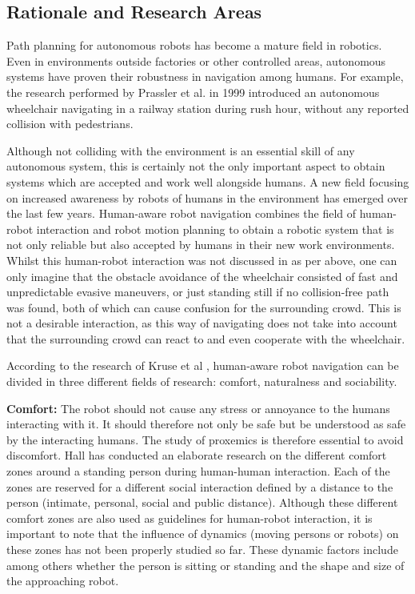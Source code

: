 \subsection{Rationale and Research Areas} \label{sec:HARNrev}
Path planning for autonomous robots has become a mature field in robotics. Even in environments outside factories or other controlled areas, autonomous systems have proven their robustness in navigation among humans. For example, the research performed by Prassler et al. \cite{PrasslerEtAl1999} in 1999 introduced an autonomous wheelchair navigating in a railway station during rush hour, without any reported collision with pedestrians.

Although not colliding with the environment is an essential skill of any autonomous system, this is certainly not the only important aspect to obtain systems which are accepted and work well alongside humans. A new field focusing on increased awareness by robots of humans in the environment has emerged over the last few years. Human-aware robot navigation combines the field of human-robot interaction and robot motion planning to obtain a robotic system that is not only reliable but also accepted by humans in their new work environments. Whilst this human-robot interaction was not discussed in \cite{PrasslerEtAl1999} as per above, one can only imagine that the obstacle avoidance of the wheelchair consisted of fast and unpredictable evasive maneuvers, or just standing still if no collision-free path was found, both of which can cause confusion for the surrounding crowd. This is not a desirable interaction, as this way of navigating does not take into account that the surrounding crowd can react to and even cooperate with the wheelchair.

According to the research of Kruse et al \cite{KruseEtAl2013}, human-aware robot navigation can be divided in three different fields of research: comfort, naturalness and sociability.

\textbf{Comfort: }
The robot should not cause any stress or annoyance to the humans interacting with it. It should therefore not only be safe but be understood as safe by the interacting humans. The study of proxemics is therefore essential to avoid discomfort. Hall \cite{Hall1966} has conducted an elaborate research on the different comfort zones around a standing person during human-human interaction. Each of the zones are reserved for a different social interaction defined by a distance to the person (intimate, personal, social and public distance). Although these different comfort zones are also used as guidelines for human-robot interaction, it is important to note that the influence of dynamics (moving persons or robots) on these zones has not been properly studied so far. These dynamic factors include among others whether the person is sitting or standing and the shape and size of the approaching robot.


